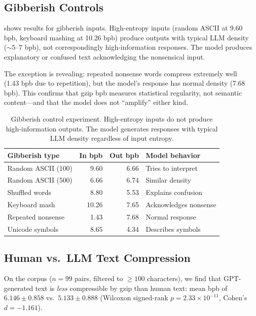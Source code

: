 \subsection{Gibberish Controls}
\label{sec:gibberish}

 shows results for gibberish inputs. High-entropy inputs (\eg random ASCII at 9.60 bpb, keyboard mashing at 10.26 bpb) produce outputs with typical LLM density (${\sim}5$--$7$ bpb), not correspondingly high-information responses. The model produces explanatory or confused text acknowledging the nonsensical input.

The exception is revealing: repeated nonsense words compress extremely well (1.43 bpb due to repetition), but the model's response has normal density (7.68 bpb). This confirms that gzip bpb measures statistical regularity, not semantic content---and that the model does not ``amplify'' either kind.

\begin{table}[t]
    \centering
    \caption{Gibberish control experiment. High-entropy inputs do not produce high-information outputs. The model generates responses with typical LLM density regardless of input entropy.}
    \label{tab:gibberish}
    \begin{tabular}{@{}lrrl@{}}
        \toprule
        \textbf{Gibberish type} & \textbf{In bpb} & \textbf{Out bpb} & \textbf{Model behavior} \\
        \midrule
        Random ASCII (100) & 9.60 & 6.66 & Tries to interpret \\
        Random ASCII (500) & 6.66 & 6.74 & Similar density \\
        Shuffled words & 8.80 & 5.53 & Explains confusion \\
        Keyboard mash & 10.26 & 7.65 & Acknowledges nonsense \\
        Repeated nonsense & 1.43 & 7.68 & Normal response \\
        Unicode symbols & 8.65 & 4.34 & Describes symbols \\
        \bottomrule
    \end{tabular}
\end{table}

\subsection{Human vs.\ LLM Text Compression}
\label{sec:humanvsgpt}

On the \gptwiki corpus ($n = 99$ pairs, filtered to $\geq 100$ characters), we find that GPT-generated text is \emph{less} compressible by gzip than human text: mean bpb of $6.146 \pm 0.858$ vs.\ $5.133 \pm 0.888$ (Wilcoxon signed-rank $p = 2.33 \times 10^{-11}$, Cohen's $d = -1.161$).

